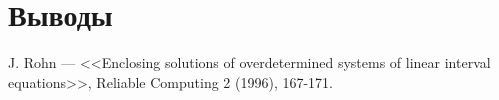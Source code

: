 \documentclass{article}
\begin{document}
  \section{Выводы}

  
  

  \begin{thebibliography}{9}
     J. Rohn --- <<Enclosing solutions of overdetermined systems of linear interval equations>>, Reliable Computing 2 (1996), 167-171.
  \end{thebibliography}
\end{document}
